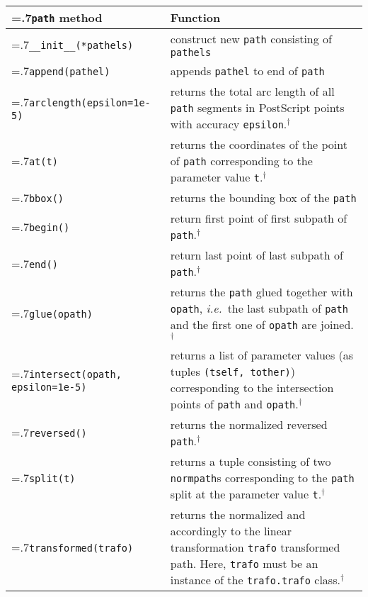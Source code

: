 \medskip
\begin{tabularx}{\linewidth}{>{\hsize=.7\hsize}X>{\raggedright\arraybackslash\hsize=1.3\hsize}X}
  \texttt{path} method & Function \\
  \hline 
  \texttt{\_\_init\_\_(*pathels)} & construct new \texttt{path}
  consisting of \texttt{pathels}\\
  \texttt{append(pathel)} & appends \texttt{pathel} to end of \texttt{path}\\
  \texttt{arclength(epsilon=1e-5)} & returns the total arc length of
  all \texttt{path} segments in  PostScript points with accuracy 
  \texttt{epsilon}.$^\dagger$\\
  \texttt{at(t)} & returns the coordinates of the point of
  \texttt{path} corresponding to the parameter value
  \texttt{t}.$^\dagger$\\
  \texttt{bbox()} & returns the bounding box of the \texttt{path}\\
  \texttt{begin()} & return first point of first subpath of
  \texttt{path}.$^\dagger$\\
  \texttt{end()} & return last point of last subpath of
  \texttt{path}.$^\dagger$\\
  \texttt{glue(opath)} & returns the \texttt{path} glued together with
  \texttt{opath}, \textit{i.e.}\ the last subpath of \texttt{path}
  and the first one of \texttt{opath} are joined.$^\dagger$\\
  \texttt{intersect(opath, \newline\phantom{intersect(}epsilon=1e-5)} &
  returns a list of parameter values (as tuples \texttt{(tself, tother)}) corresponding to the 
  intersection points of \texttt{path} and \texttt{opath}.$^\dagger$\\
  \texttt{reversed()} & returns the normalized reversed
  \texttt{path}.$^\dagger$\\
  \texttt{split(t)} & returns a tuple consisting of two
  \texttt{normpath}s corresponding to the \texttt{path} split at
  the parameter value \texttt{t}.$^\dagger$\\
  \texttt{transformed(trafo)} & returns the normalized and accordingly
  to the linear transformation \texttt{trafo} transformed path. Here,
  \texttt{trafo} must be an   instance of the \texttt{trafo.trafo} class.$^\dagger$
\end{tabularx} 
\medskip

